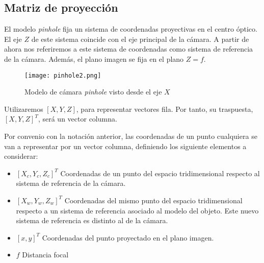

\subsection{Matriz de proyección}\label{subsec:matproy}
El modelo \textit{pinhole} \cite{Hartley} fija un sistema de coordenadas proyectivas en el centro óptico. El eje $Z$ de este sistema coincide con el eje principal de la cámara. A partir de ahora nos referiremos a este sistema de coordenadas como sistema de referencia de la cámara. Además, el plano imagen se fija en el plano $Z = f$.

\begin{figure}[h]
  \centering
  \texttt{[image: pinhole2.png]}
  \caption{Modelo de cámara \textit{pinhole} visto desde el eje $X$}
  \label{fig:pinholeCamera2}
\end{figure}

Utilizaremos $[X, Y, Z]$, para representar vectores fila. Por tanto, su traspuesta, $[X, Y, Z]^T$, será un vector columna. 

Por convenio con la notación anterior, las coordenadas de un punto cualquiera se van a representar por un vector columna, definiendo los siguiente elementos a considerar:
\begin{itemize}
\item $[X_c , Y_c , Z_c ]^T$ Coordenadas de un punto del espacio tridimensional respecto al sistema de referencia de la cámara.
\item $[X_w , Y_w , Z_w ]^T$ Coordenadas del mismo punto del espacio tridimensional respecto a un sistema de referencia asociado al modelo del objeto. Este nuevo sistema de referencia es distinto al de la cámara.
\item $[x, y]^T$  Coordenadas del punto proyectado en el plano imagen.
\item $f$  Distancia focal
\end{itemize}

